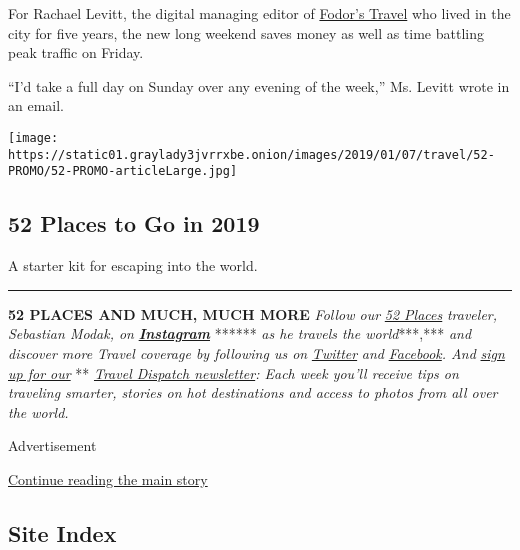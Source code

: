 For Rachael Levitt, the digital managing editor of
\href{http://www.fodors.com/}{Fodor's Travel} who lived in the city for
five years, the new long weekend saves money as well as time battling
peak traffic on Friday.

``I'd take a full day on Sunday over any evening of the week,'' Ms.
Levitt wrote in an email.

\href{https://www.nytimes3xbfgragh.onion/interactive/2019/travel/places-to-visit.html}{}

\texttt{[image: https://static01.graylady3jvrrxbe.onion/images/2019/01/07/travel/52-PROMO/52-PROMO-articleLarge.jpg]}

\hypertarget{52-places-to-go-in-2019}{%
\subsection{52 Places to Go in 2019}\label{52-places-to-go-in-2019}}

A starter kit for escaping into the world.

\begin{center}\rule{0.5\linewidth}{\linethickness}\end{center}

\textbf{52 PLACES AND MUCH, MUCH MORE} \emph{Follow our}
\href{https://www.nytimes3xbfgragh.onion/interactive/2019/travel/places-to-visit.html?action=click\&module=inline\&pgtype=Article}{\emph{52
Places}} \emph{traveler, Sebastian Modak, on}
\textbf{\href{https://www.instagram.com/nytimestravel/}{\emph{Instagram}}}
****** \emph{as he travels the world}***,*** \emph{and discover more
Travel coverage by following us on}
\href{https://twitter.com/nytimestravel}{\emph{Twitter}} \emph{and}
\href{https://www.facebookcorewwwi.onion/nytimestravel/}{\emph{Facebook}}\emph{.
And}
\href{https://www.nytimes3xbfgragh.onion/newsletters/traveldispatch?action=click\&module=inline\&pgtype=Article}{\emph{sign
up for our}} **
\href{https://www.nytimes3xbfgragh.onion/newsletters/traveldispatch}{\emph{Travel
Dispatch newsletter}}\emph{: Each week you'll receive tips on traveling
smarter, stories on hot destinations and access to photos from all over
the world.}

Advertisement

\protect\hyperlink{after-bottom}{Continue reading the main story}

\hypertarget{site-index}{%
\subsection{Site Index}\label{site-index}}

